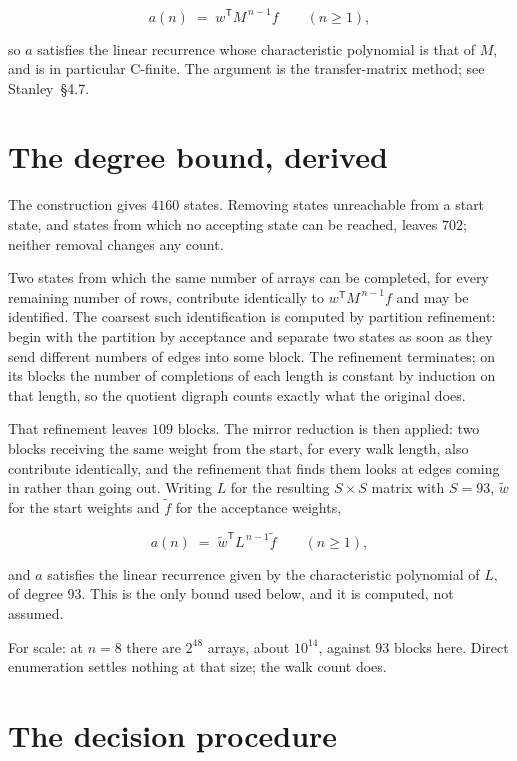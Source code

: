 \documentclass[11pt]{article}
\theoremstyle{definition}
\begin{document}
\[a(n) \;=\; w^{\mathsf T} M^{\,n-1} f \qquad (n \ge 1),\]

so $a$ satisfies the linear recurrence whose characteristic polynomial is that of $M$, and is in particular C-finite. The argument is the transfer-matrix method; see Stanley~\S4.7.

\section{The degree bound, derived}

The construction gives $4160$ states. Removing states unreachable from a start state, and states from which no accepting state can be reached, leaves $702$; neither removal changes any count.

Two states from which the same number of arrays can be completed, for every remaining number of rows, contribute identically to $w^{\mathsf T}M^{\,n-1}f$ and may be identified. The coarsest such identification is computed by partition refinement: begin with the partition by acceptance and separate two states as soon as they send different numbers of edges into some block. The refinement terminates; on its blocks the number of completions of each length is constant by induction on that length, so the quotient digraph counts exactly what the original does.

That refinement leaves $109$ blocks. The mirror reduction is then applied: two blocks receiving the same weight from the start, for every walk length, also contribute identically, and the refinement that finds them looks at edges coming in rather than going out. Writing $L$ for the resulting $S \times S$ matrix with $S = 93$, $\tilde w$ for the start weights and $\tilde f$ for the acceptance weights,

\[a(n) \;=\; \tilde w^{\mathsf T} L^{\,n-1} \tilde f \qquad (n \ge 1),\]

and $a$ satisfies the linear recurrence given by the characteristic polynomial of $L$, of degree $93$. This is the only bound used below, and it is computed, not assumed.

For scale: at $n = 8$ there are $2^{48}$ arrays, about $10^{14}$, against $93$ blocks here. Direct enumeration settles nothing at that size; the walk count does.

\section{The decision procedure}
\end{document}
